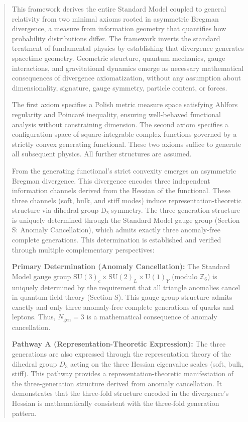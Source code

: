 

\begin{abstract}

This framework derives the entire Standard Model coupled to general relativity from two minimal axioms rooted in asymmetric Bregman divergence, a measure from information geometry that quantifies how probability distributions differ. The framework inverts the standard treatment of fundamental physics by establishing that divergence generates spacetime geometry. Geometric structure, quantum mechanics, gauge interactions, and gravitational dynamics emerge as necessary mathematical consequences of divergence axiomatization, without any assumption about dimensionality, signature, gauge symmetry, particle content, or forces.

The first axiom specifies a Polish metric measure space satisfying Ahlfors regularity and Poincaré inequality, ensuring well-behaved functional analysis without constraining dimension. The second axiom specifies a configuration space of square-integrable complex functions governed by a strictly convex generating functional. These two axioms suffice to generate all subsequent physics. All further structures are assumed.

From the generating functional's strict convexity emerges an asymmetric Bregman divergence. This divergence encodes three independent information channels derived from the Hessian of the functional. These three channels (soft, bulk, and stiff modes) induce representation-theoretic structure via dihedral group D₃ symmetry. The three-generation structure is uniquely determined through the Standard Model gauge group (Section S: Anomaly Cancellation), which admits exactly three anomaly-free complete generations. This determination is established and verified through multiple complementary perspectives:

\textbf{Primary Determination (Anomaly Cancellation):} The Standard Model gauge group $\mathrm{SU}(3)_c \times \mathrm{SU}(2)_L \times \mathrm{U}(1)_Y$ (modulo $\mathbb{Z}_6$) is uniquely determined by the requirement that all triangle anomalies cancel in quantum field theory (Section S). This gauge group structure admits exactly and only three anomaly-free complete generations of quarks and leptons. Thus, $N_{\text{gen}} = 3$ is a mathematical consequence of anomaly cancellation.

\textbf{Pathway A (Representation-Theoretic Expression):} The three generations are also expressed through the representation theory of the dihedral group $D_3$ acting on the three Hessian eigenvalue scales (soft, bulk, stiff). This pathway provides a representation-theoretic manifestation of the three-generation structure derived from anomaly cancellation. It demonstrates that the three-fold structure encoded in the divergence's Hessian is mathematically consistent with the three-fold generation pattern.


\end{abstract}
